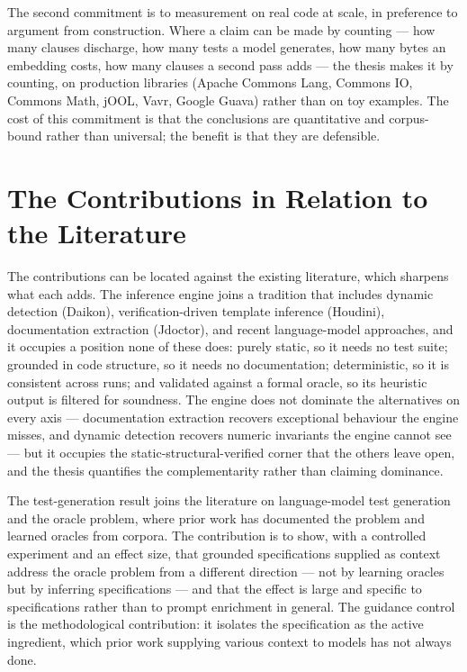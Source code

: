 The second commitment is to measurement on real code at scale, in preference
to argument from construction. Where a claim can be made by counting --- how
many clauses discharge, how many tests a model generates, how many bytes an
embedding costs, how many clauses a second pass adds --- the thesis makes it
by counting, on production libraries (Apache Commons Lang, Commons IO,
Commons Math, jOOL, Vavr, Google Guava) rather than on toy examples. The cost
of this commitment is that the conclusions are quantitative and corpus-bound
rather than universal; the benefit is that they are defensible.

\section{The Contributions in Relation to the Literature}

The contributions can be located against the existing literature, which sharpens
what each adds. The inference engine joins a tradition that includes dynamic
detection (Daikon), verification-driven template inference (Houdini),
documentation extraction (Jdoctor), and recent language-model approaches, and it
occupies a position none of these does: purely static, so it needs no test suite;
grounded in code structure, so it needs no documentation; deterministic, so it is
consistent across runs; and validated against a formal oracle, so its heuristic
output is filtered for soundness. The engine does not dominate the alternatives on
every axis --- documentation extraction recovers exceptional behaviour the engine
misses, and dynamic detection recovers numeric invariants the engine cannot see ---
but it occupies the static-structural-verified corner that the others leave open,
and the thesis quantifies the complementarity rather than claiming dominance.

The test-generation result joins the literature on language-model test generation
and the oracle problem, where prior work has documented the problem and learned
oracles from corpora. The contribution is to show, with a controlled experiment and
an effect size, that grounded specifications supplied as context address the oracle
problem from a different direction --- not by learning oracles but by inferring
specifications --- and that the effect is large and specific to specifications
rather than to prompt enrichment in general. The guidance control is the
methodological contribution: it isolates the specification as the active
ingredient, which prior work supplying various context to models has not always
done.

